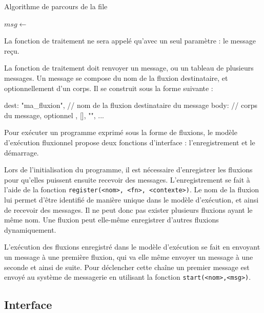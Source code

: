 \begin{algorithm}
\caption{Algorithme de parcours de la file}
\begin{algorithmic}
\State $msg \gets$ 
\State {}
\EndWhile
\EndFunction
\end{algorithmic}
\end{algorithm}

La fonction de traitement ne sera appelé qu'avec un seul paramètre : le message reçu.

La fonction de traitement doit renvoyer un message, ou un tableau de plusieurs messages.
Un message se compose du nom de la fluxion destinataire, et optionnellement d'un corps.
Il se construit sous la forme suivante :

\begin{code}
{
  dest: "ma_fluxion", // nom de la fluxion destinataire du message
  body: // corps du message, optionnel
      {}, [], "", ...
}
\end{code}

Pour exécuter un programme exprimé sous la forme de fluxions, le modèle d'exécution fluxionnel propose deux fonctions d'interface : l'enregistrement et le démarrage.

Lors de l'initialisation du programme, il est nécessaire d'enregistrer les fluxions pour qu'elles puissent ensuite recevoir des messages.
L'enregistrement se fait à l'aide de la fonction \texttt{register(<nom>, <fn>, <contexte>)}.
Le nom de la fluxion lui permet d'être identifié de manière unique dans le modèle d'exécution, et ainsi de recevoir des messages.
Il ne peut donc pas exister plusieurs fluxions ayant le même nom.
Une fluxion peut elle-même enregistrer d'autres fluxions dynamiquement.

L'exécution des fluxions enregistré dans le modèle d'exécution se fait en envoyant un message à une première fluxion, qui va elle même envoyer un message à une seconde et ainsi de suite.
Pour déclencher cette chaîne un premier message est envoyé au système de messagerie en utilisant la fonction \texttt{start(<nom>,<msg>)}.

\subsection{Interface}

